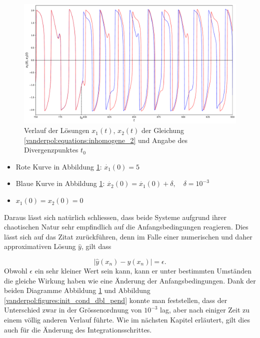 \begin{figure}
\includegraphics[width=\textwidth]{papers/vanderpol/figures/initial_cond_VDP.pdf}
\caption{Verlauf der Lösungen $x_1(t)$, $x_2(t)$ der Gleichung \eqref{vanderpol:equations:inhomogene_2} und Angabe des Divergenzpunktes $t_0$ \label{vanderpol:figures:init_cond_VDP}}
\end{figure}

\begin{itemize}
\item
Rote Kurve in Abbildung \ref{vanderpol:figures:init_cond_VDP}: $\dot{x_1}(0) = 5$
\item
Blaue Kurve in Abbildung \ref{vanderpol:figures:init_cond_VDP}: $\dot{x_2}(0) = \dot{x_1}(0) + \delta, \quad \delta = 10^{-3}$ 
\item
$x_1(0) = x_2(0) = 0$
\end{itemize}
Daraus lässt sich natürlich schliessen, dass beide Systeme aufgrund ihrer chaotischen Natur sehr empfindlich auf die Anfangsbedingungen reagieren.
Dies lässt sich auf das Zitat zurückführen, denn im Falle einer numerischen und daher approximativen Lösung $\hat{y}$, gilt dass

\begin{equation} 
|\hat{y}(x_n) - y(x_n)| = \epsilon.
\end{equation}
Obwohl $\epsilon$ ein sehr kleiner Wert sein kann, kann er unter bestimmten Umständen die gleiche Wirkung haben wie eine Änderung der Anfangsbedingungen.
Dank der beiden Diagramme Abbildung \ref{vanderpol:figures:init_cond_VDP} und Abbildung \ref{vanderpol:figures:init_cond_dbl_pend} konnte man feststellen, dass der Unterschied zwar in der Grössenordnung von $10^{-3}$ lag, aber nach einiger Zeit zu einem völlig anderen Verlauf führte.
Wie im nächsten Kapitel erläutert, gilt dies auch für die Änderung des Integrationsschrittes.

